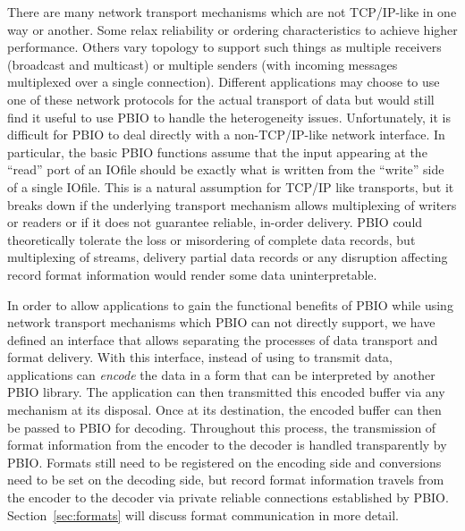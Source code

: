 There are many network transport mechanisms which are not TCP/IP-like in one
way or another.  Some relax reliability or ordering characteristics to achieve
higher performance.  Others vary topology to support such things as multiple
receivers (broadcast and multicast) or multiple senders (with incoming
messages multiplexed over a single connection).  Different applications may
choose to use one of these network protocols for the actual transport of data
but would still find it useful to use PBIO to handle the heterogeneity issues.
Unfortunately, it is difficult for PBIO to deal directly with a
non-TCP/IP-like network interface.  In particular, the basic PBIO functions
assume that the input appearing at the ``read'' port of an IOfile should be
exactly what is written from the ``write'' side of a single IOfile.  This is a
natural assumption for TCP/IP like transports, but it breaks down if the
underlying transport mechanism allows multiplexing of writers or readers or if
it does not guarantee reliable, in-order delivery.  PBIO could theoretically
tolerate the loss or misordering of complete data records, but multiplexing of
streams, delivery partial data records or any disruption affecting record
format information would render some data uninterpretable. 

In order to allow applications to gain the functional benefits of PBIO while
using network transport mechanisms which PBIO can not directly support, we
have defined an interface that allows separating the processes of data
transport and format delivery.  With this interface, instead of using
 to transmit data, applications can {\em encode} the data in
a form that can be interpreted by another PBIO library.  The application can
then transmitted this encoded buffer via any mechanism at its disposal.  Once
at its destination, the encoded buffer can then be passed to PBIO for decoding.
Throughout this process, the transmission of format information from the
encoder to the decoder is handled transparently by PBIO.  Formats still need
to be registered on the encoding side and conversions need to be set on the
decoding side, but record format information travels from the encoder to the
decoder via private reliable connections established by PBIO.
Section~\ref{sec:formats} will discuss format communication in more detail.

